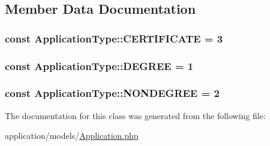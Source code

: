 \subsection{Member Data Documentation}
\hypertarget{class_application_type_aa47002a4e563f65b4475f50a803669a5}{
\subsubsection[{C\-E\-R\-T\-I\-F\-I\-C\-A\-T\-E}]{\setlength{\rightskip}{0pt plus 5cm}const Application\-Type\-::\-C\-E\-R\-T\-I\-F\-I\-C\-A\-T\-E = 3}}\label{class_application_type_aa47002a4e563f65b4475f50a803669a5}
\hypertarget{class_application_type_a97fb740c9a478311ae614507b11f42d6}{
\subsubsection[{D\-E\-G\-R\-E\-E}]{\setlength{\rightskip}{0pt plus 5cm}const Application\-Type\-::\-D\-E\-G\-R\-E\-E = 1}}\label{class_application_type_a97fb740c9a478311ae614507b11f42d6}
\hypertarget{class_application_type_a1049360b5c4e6811bd8d75c7de7792b1}{
\subsubsection[{N\-O\-N\-D\-E\-G\-R\-E\-E}]{\setlength{\rightskip}{0pt plus 5cm}const Application\-Type\-::\-N\-O\-N\-D\-E\-G\-R\-E\-E = 2}}\label{class_application_type_a1049360b5c4e6811bd8d75c7de7792b1}


The documentation for this class was generated from the following file\-:\begin{DoxyCompactItemize}
\item 
application/models/\hyperlink{_application_8php}{Application.\-php}\end{DoxyCompactItemize}

